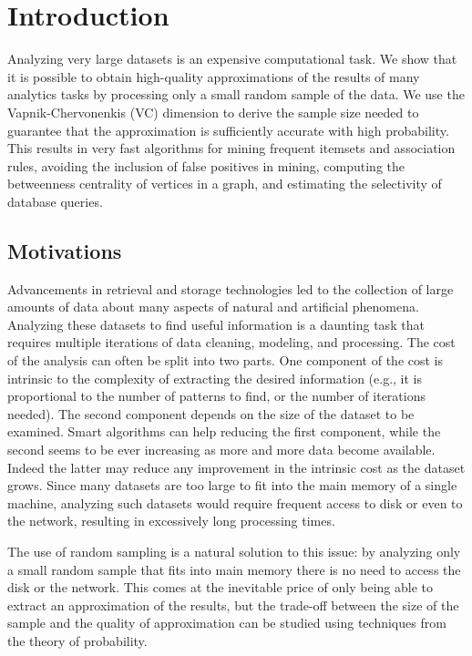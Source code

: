 \chapter{Introduction}\label{ch:intro}

 Analyzing very large datasets is an expensive
computational task. We show that it is possible to obtain high-quality
approximations of the results of many analytics tasks by processing only a small
random sample of the data. We use the Vapnik-Chervonenkis (VC) dimension to
derive the sample size needed to guarantee that the approximation is
sufficiently accurate with high probability. This results in very fast
algorithms for mining frequent itemsets and association rules, avoiding the
inclusion of false positives in mining, computing the betweenness centrality of
vertices in a graph, and estimating the selectivity of database queries.

\section{Motivations}
Advancements in retrieval and storage technologies led to the collection of
large amounts of data about many aspects of natural and artificial phenomena.
Analyzing these datasets to find useful information is a daunting task that
requires multiple iterations of data cleaning, modeling, and processing. The
cost of the analysis can often be split into two parts. One component of the
cost is intrinsic to the complexity of extracting the desired information (e.g.,
it is proportional to the number of patterns to find, or the number of iterations
needed). The second component depends on the size of the dataset to be examined.
Smart algorithms can help reducing the first component, while the second seems
to be ever increasing as more and more data become available. Indeed the latter
may reduce any improvement in the intrinsic cost as the dataset grows. Since
many datasets are too large to fit into the main memory of a single machine,
analyzing such datasets would require frequent access to disk or even to the
network, resulting in excessively long processing times.

The use of random sampling is a natural solution to this issue:
by analyzing only a small random sample that fits into main memory there is no
need to access the disk or the network. This comes at the inevitable price of
only being able to extract an approximation of the results, but the trade-off
between the size of the sample and the quality of approximation can be studied
using techniques from the theory of probability. 

